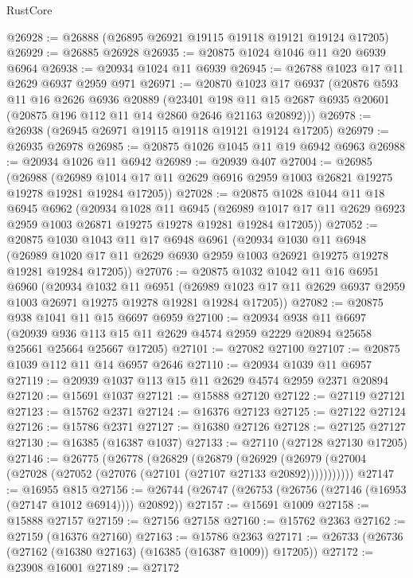 \begin{lexlean}{RustCore}
\begin{coremodule}
@26928 := @26888 (@26895 @26921 @19115 @19118 @19121 @19124 @17205)
@26929 := @26885 @26928
@26935 := @20875 @1024 @1046 @11 @20 @6939 @6964
@26938 := @20934 @1024 @11 @6939
@26945 := @26788 @1023 @17 @11 @2629 @6937 @2959 @971
@26971 := @20870
    @1023
    @17
    @6937
    (@20876
      @593
      @11
      @16
      @2626
      @6936
      @20889
      (@23401 @198 @11 @15 @2687 @6935 @20601 (@20875 @196 @112 @11 @14 @2860 @2646 @21163 @20892)))
@26978 := @26938 (@26945 @26971 @19115 @19118 @19121 @19124 @17205)
@26979 := @26935 @26978
@26985 := @20875 @1026 @1045 @11 @19 @6942 @6963
@26988 := @20934 @1026 @11 @6942
@26989 := @20939 @407
@27004 := @26985
    (@26988
      (@26989 @1014 @17 @11 @2629 @6916 @2959 @1003 @26821 @19275 @19278 @19281 @19284 @17205))
@27028 := @20875
    @1028
    @1044
    @11
    @18
    @6945
    @6962
    (@20934
      @1028
      @11
      @6945
      (@26989 @1017 @17 @11 @2629 @6923 @2959 @1003 @26871 @19275 @19278 @19281 @19284 @17205))
@27052 := @20875
    @1030
    @1043
    @11
    @17
    @6948
    @6961
    (@20934
      @1030
      @11
      @6948
      (@26989 @1020 @17 @11 @2629 @6930 @2959 @1003 @26921 @19275 @19278 @19281 @19284 @17205))
@27076 := @20875
    @1032
    @1042
    @11
    @16
    @6951
    @6960
    (@20934
      @1032
      @11
      @6951
      (@26989 @1023 @17 @11 @2629 @6937 @2959 @1003 @26971 @19275 @19278 @19281 @19284 @17205))
@27082 := @20875 @938 @1041 @11 @15 @6697 @6959
@27100 := @20934
    @938
    @11
    @6697
    (@20939 @936 @113 @15 @11 @2629 @4574 @2959 @2229 @20894 @25658 @25661 @25664 @25667 @17205)
@27101 := @27082 @27100
@27107 := @20875 @1039 @112 @11 @14 @6957 @2646
@27110 := @20934 @1039 @11 @6957
@27119 := @20939 @1037 @113 @15 @11 @2629 @4574 @2959 @2371 @20894
@27120 := @15691 @1037
@27121 := @15888 @27120
@27122 := @27119 @27121
@27123 := @15762 @2371
@27124 := @16376 @27123
@27125 := @27122 @27124
@27126 := @15786 @2371
@27127 := @16380 @27126
@27128 := @27125 @27127
@27130 := @16385 (@16387 @1037)
@27133 := @27110 (@27128 @27130 @17205)
@27146 := @26775
    (@26778
      (@26829
        (@26879
          (@26929 (@26979 (@27004 (@27028 (@27052 (@27076 (@27101 (@27107 @27133 @20892)))))))))))
@27147 := @16955 @815
@27156 := @26744 (@26747 (@26753 (@26756 (@27146 (@16953 (@27147 @1012 @6914)))) @20892))
@27157 := @15691 @1009
@27158 := @15888 @27157
@27159 := @27156 @27158
@27160 := @15762 @2363
@27162 := @27159 (@16376 @27160)
@27163 := @15786 @2363
@27171 := @26733 (@26736 (@27162 (@16380 @27163) (@16385 (@16387 @1009)) @17205))
@27172 := @23908 @16001
@27189 := @27172

\end{coremodule}
\end{lexlean}
